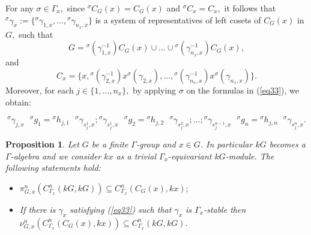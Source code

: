 \documentclass[pdflatex,sn-mathphys-num]{sn-jnl}
\numberwithin{equation}{section}
\theoremstyle{thmstyleone}
\newtheorem{proposition}[theorem]{Proposition}
\theoremstyle{thmstyletwo}
\theoremstyle{thmstylethree}
\begin{document}
For any $\sigma \in\Gamma_x,$ since ${}^{\sigma}C_G(x)=C_G(x)$ and $^{\sigma}C_x=C_x,$ it follows that ${}^{\sigma} \gamma_x:=\{{}^{\sigma}\gamma_{1,x},\ldots,{}^{\sigma}\gamma_{n_x,x}\}$ is a system of representatives of left cosets of $C_G(x)$ in $G,$ such that
    $$G={}^{\sigma}(\gamma_{1,x}^{-1}) C_G(x)\cup \dots \cup {}^{\sigma}( \gamma_{n_x,x}^{-1}) C_G(x),$$ and
    $$C_x=\{x, {}^{\sigma}(\gamma_{2,x}^{-1})x{}^{\sigma}(\gamma_{2,x}),\ldots,{}^{\sigma}(\gamma_{n_x,x}^{-1})x{}^{\sigma}(\gamma_{n_x,x})\}.$$
    Moreover, for each $j\in \{1,\ldots,n_x\},$ by applying $\sigma$ on the formulas in (\ref{eq33}), we obtain:

  \begin{equation}\label{eq33'} {}^{\sigma}\gamma_{j,x}\mbox{ }^{\sigma}g_1={}^{\sigma}h_{j,1}\mbox{ }^{\sigma}\gamma_{s_j^1,x}; {}^{\sigma}\gamma_{s_j^1,x}\mbox{ }^{\sigma}g_2=
    {}^{\sigma}h_{j,2}\mbox{ }^{\sigma}\gamma_{s_j^2,x};
    \dots;{}^{\sigma}\gamma_{s_j^{n-1},x}\mbox{ }^{\sigma}g_n={}^{\sigma}h_{j,n}\mbox{ }^{\sigma}\gamma_{s_j^n,x}.
   \end{equation}

\begin{proposition}\label{prop32} Let $G$ be a finite $\Gamma$-group and $x\in G$. In particular $kG$ becomes a $\Gamma$-algebra and we consider $kx$ as a trivial  $\Gamma_x$-equivariant $kG$-module.  The following statements hold:
\begin{itemize}
\item[i).] $\pi_{G,x}^n(C_{\Gamma_x}^n(kG,kG))\subseteq C_{\Gamma_x}^n(C_G(x),kx);$
\item[ii).]  If there is $\gamma_x$ satisfying (\ref{eq33}) such that $\gamma_x$ is $\Gamma_x$-stable then $\nu_{G,x}^n(C_{\Gamma_x}^n(C_G(x),kx))\subseteq C_{\Gamma_x}^n(kG,kG).$
\end{itemize}
\end{proposition}
\end{document}
